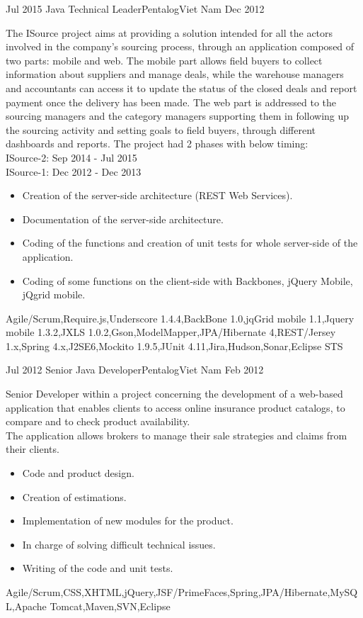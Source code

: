 \begin{experiences}
\experience
  {Jul 2015}  {Java Technical Leader}{Pentalog}{Viet Nam}
  {Dec 2012}  {  
The ISource project aims at providing a solution intended for all the actors involved in the company's sourcing process, through an application composed of two parts: mobile and web. The mobile part allows field buyers to collect information about suppliers and manage deals, while the warehouse managers and accountants can access it to update the status of the closed deals and report payment once the delivery has been made. The web part is addressed to the sourcing managers and the category managers supporting them in following up the sourcing activity and setting goals to field buyers, through different dashboards and reports.
\vspace{2mm}
The project had 2 phases with below timing:\\
ISource-2: Sep 2014 - Jul 2015\\
ISource-1: Dec 2012 - Dec 2013
\vspace{2mm}
	\begin{itemize}
        \item Creation of the server-side architecture (REST Web Services).       
        \item Documentation of the server-side architecture.                       \item Coding of the functions and creation of unit tests for whole server-side of the application.
        \item Coding of some functions on the client-side with Backbones, jQuery Mobile, jQgrid mobile.        
	\end{itemize}
}
{Agile/Scrum,Require.js,Underscore 1.4.4,BackBone 1.0,jqGrid mobile 1.1,Jquery mobile 1.3.2,JXLS 1.0.2,Gson,ModelMapper,JPA/Hibernate 4,REST/Jersey 1.x,Spring 4.x,J2SE6,Mockito 1.9.5,JUnit 4.11,Jira,Hudson,Sonar,Eclipse STS}
\emptySeparator

\experience
  {Jul 2012}  {Senior Java Developer}{Pentalog}{Viet Nam}
  {Feb 2012}   {
Senior Developer within a project concerning the development of a web-based application that enables clients to access online insurance product catalogs, to compare and to check product availability.\\
The application allows brokers to manage their sale strategies and claims from their clients.
	\begin{itemize}
        \item Code and product design.       
        \item Creation of estimations.                 
        \item Implementation of new modules for the product.
        \item In charge of solving difficult technical issues.
        \item Writing of the code and unit tests.
	\end{itemize}
}
{Agile/Scrum,CSS,XHTML,jQuery,JSF/PrimeFaces,Spring,JPA/Hibernate,MySQL,Apache Tomcat,Maven,SVN,Eclipse}
\emptySeparator


\end{experiences}
